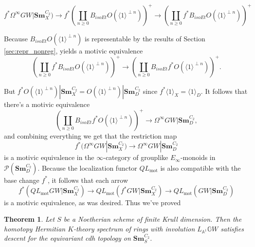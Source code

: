 \documentclass[edeposit,fullpage]{uiucthesis2009}
\newcommand{\mbb}{\mathbb}
\newcommand{\mc}{\mathcal}
\newcommand{\Sm}[1]{\mathbf{Sm}_{#1}}
\theoremstyle{plain}
\numberwithin{lemma}{section}
\newtheorem{theorem}[lemma]{Theorem}
\theoremstyle{definition}
\begin{document}
\[
f^*\Omega^\infty GW|\Sm{X}^{C_2})\rightarrow  f^*\left(\coprod_{n \geq 0} B_{isoEt}O(\langle 1 \rangle^{\perp
    n})\right)^+ \rightarrow \left(\coprod_{n \geq 0} f^*B_{isoEt}O(\langle 1 \rangle^{\perp
    n})\right)^+
\]

Because $B_{isoEt}O(\langle 1 \rangle^{\perp n})$ is representable by
the results of Section \ref{sec:repr_nonreg},
\cite [Proposition 2.9]{cdhdesc} yields a motivic equivalence
\[
\left(\coprod_{n \geq 0} f^*B_{isoEt}O(\langle 1 \rangle^{\perp
    n})\right)^+ \rightarrow \left(\coprod_{n \geq 0} B_{isoEt}f^*O(\langle 1 \rangle^{\perp
    n})\right)^+.
\]

But $f^*O(\langle 1 \rangle^{\perp n})|\Sm{X}^{C_2} = O(\langle 1
\rangle^{\perp n})|\Sm{D}^{C_2}$ since $f^*\langle 1 \rangle_X =
\langle 1 \rangle_D$. It follows that there's a motivic equivalence 
\[
 \left(\coprod_{n \geq 0} B_{isoEt}f^*O(\langle 1 \rangle^{\perp
    n})\right)^+ \rightarrow \Omega^\infty GW|\Sm{D}^{C_2},
\]
and combining everything we get that the restriction map
\[
f^*(\Omega^\infty GW|\Sm{X}^{C_2}) \rightarrow \Omega^\infty GW|\Sm{D}^{C_2}
\]
is a motivic equivalence in the $\infty$-category of grouplike
$E_\infty$-monoids in $\mc P(\Sm{D}^{C_2})$. Because the localization
functor $QL_{\mathrm{mot}}$ is also compatible with the base change
$f^*$, it follows that each arrow 
\[
f^*(QL_{\mathrm{mot}}GW|\Sm{X}^{C_2}) \rightarrow
QL_{\mathrm{mot}}(f^*GW|\Sm{X}^{C_2}) \rightarrow QL_{\mathrm{mot}}(GW|\Sm{D}^{C_2})
\]
is a motivic equivalence, as was desired. Thus we've proved

\begin{theorem}\label{thm:cdh_desc}
Let $S$ be a Noetherian scheme of finite Krull dimension. Then the
homotopy Hermitian $K$-theory spectrum of rings with involution $L_{\mbb A^1}\mbb
GW$ satisfies descent for the equivariant cdh topology on $\Sm{S}^{C_2}$.
\end{theorem}



\end{document}
